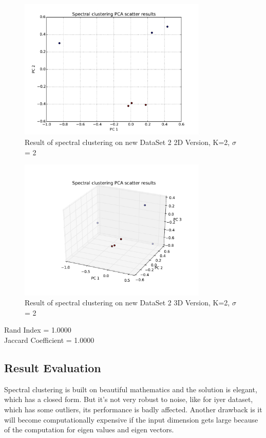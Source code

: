 \documentclass[paper=letter, fontsize=11pt]{article}
\numberwithin{equation}{section}		%
\numberwithin{figure}{section}			%
\numberwithin{table}{section}				%
\begin{document}
\begin{figure}[H]
	\centering
	\includegraphics[width=0.8\textwidth]{S_new_dataset_2_2D.pdf}
	\caption{Result of spectral clustering on new DataSet 2 2D Version, K=2, $\sigma$ = 2}
\end{figure}

\begin{figure}[H]
	\centering
	\includegraphics[width=0.8\textwidth]{S_new_dataset_2_3D.pdf}
	\caption{Result of spectral clustering on new DataSet 2 3D Version, K=2, $\sigma$ = 2}
\end{figure}
\noindent Rand Index = 1.0000\\
Jaccard Coefficient = 1.0000\\

\subsection{Result Evaluation}
Spectral clustering is built on beautiful mathematics and the solution is elegant, which has a closed form. But it's not very robust to noise, like for iyer dataset, which has some outliers, its performance is badly affected. Another drawback is it will become computationally expensive if the input dimension gets large because of the computation for eigen values and eigen vectors.
\end{document}
